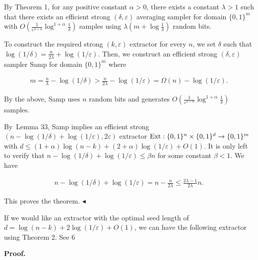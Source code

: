 By Theorem 1, for any positive constant $\alpha>0$, there exists a constant $\lambda>1$ such that there exists an efficient strong $(\delta,\varepsilon)$ averaging sampler for domain $\{0,1\}^{m}$ with $O(\frac{1}{\varepsilon^{2+\alpha}}\log^{1+\alpha}\frac{1}{\delta})$ samples using $\lambda(m+\log\frac{1}{\delta})$ random bits.\par




To construct the required strong $(k,\varepsilon)$ extractor for every $n$, we set $\delta$ such that $\log(1/\delta)=\frac{n}{2\lambda}+\log(1/\varepsilon)$.
Then, we construct an efficient strong $(\delta,\varepsilon)$ sampler Samp for domain $\{0,1\}^{m}$ where\par


\[\begin{gathered}
m=\frac{n}{\lambda}-\log(1/\delta)>\frac{n}{2\lambda}-\log(1/\varepsilon)=\Omega(n)-\log(1/\varepsilon).
\end{gathered}\]


By the above, Samp uses $n$ random bits and generates $O(\frac{1}{\varepsilon^{2+\alpha}}\log^{1+\alpha}\frac{1}{\delta})$ samples.\par




By Lemma 33, Samp implies an efficient strong $(n-\log(1/\delta)+\log(1/\varepsilon),2\varepsilon)$ extractor $\textup{{Ext}}:\{0,1\}^{n}\times\{0,1\}^{d}\to\{0,1\}^{m}$ with $d\leq(1+\alpha)\log(n-k)+(2+\alpha)\log(1/\varepsilon)+O(1)$.
It is only left to verify that $n-\log(1/\delta)+\log(1/\varepsilon)\leq\beta n$ for some constant $\beta<1$. We have\par


\[\begin{gathered}
n-\log(1/\delta)+\log(1/\varepsilon)=n-\frac{n}{2\lambda}\leq\frac{2\lambda-1}{2\lambda}n.
\end{gathered}\]


This proves the theorem.
$\blacktriangleleft$\par




If we would like an extractor with the optimal seed length of $d=\log(n-k)+2\log(1/\varepsilon)+O(1)$, we can have the following extractor using Theorem 2.
See 6\par





\par\medskip\noindent\textbf{Proof.}\par




